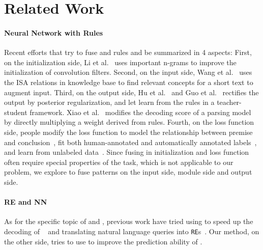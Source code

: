 \section{Related Work}

\paragraph{Neural Network with Rules}
Recent efforts that try to fuse \NN and rules and be summarized in 4 aspects:
First, on the initialization side, Li et al.~ uses important n-grams to improve the initialization of convolution filters.
Second, on the input side, Wang et al.~ uses the ISA relations in knowledge base to find relevant concepts for a short text to augment input.
Third, on the output side, Hu et al.~ and Guo et al.~ rectifies the \NN output by posterior regularization, and let \NN learn from the rules in a teacher-student framework. 
Xiao et al.~ modifies the decoding score of a parsing model by directly multiplying a weight derived from rules. 
Fourth, on the loss function side, people modify the loss function to model the relationship between premise and conclusion~\cite{demeester2016lifted}, fit both human-annotated and automatically annotated labels~\cite{alashkar2017examples}, and learn from unlabeled data~\cite{xu2017semantic}.
Since fusing in initialization and loss function often require special properties of the task, which is not applicable to our problem, we explore to fuse \RE patterns on the input side, \NN module side and output side.   

\paragraph{RE and NN}
As for the specific topic of \RE and \NN, previous work have tried using \RE to speed up the decoding of \NN~\cite{strauss2016regular} and translating natural language queries into \texttt{RE}s~\cite{locascio2016neural}. Our method, on the other side, tries to use \RE to improve the prediction ability of \NN.

